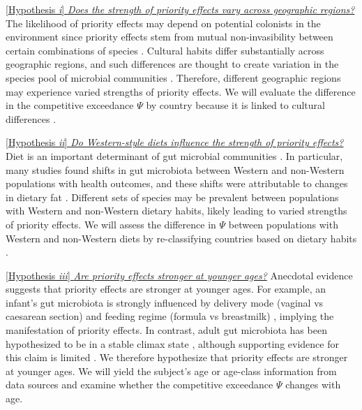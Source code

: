 \documentclass[12pt, class=article, crop=false]{standalone}
\begin{document}
\ul{[Hypothesis \textit{i}] \textit{Does the strength of priority effects vary across geographic regions?}} 
The likelihood of priority effects may depend on potential colonists in the environment since priority effects stem from mutual non-invasibility between certain combinations of species \citep{fukami_historical_2015}.
Cultural habits differ substantially across geographic regions, and such differences are thought to create variation in the species pool of microbial communities \citep{de_filippo_impact_2010, yatsunenko_human_2012, david_host_2014}.
Therefore, different geographic regions may experience varied strengths of priority effects.
We will evaluate the difference in the competitive exceedance $\Psi$ by country because it is linked to cultural differences \citep{yatsunenko_human_2012}.

\ul{[Hypothesis \textit{ii}] \textit{Do Western-style diets influence the strength of priority effects?}}
Diet is an important determinant of gut microbial communities \citep{de_filippo_impact_2010, yatsunenko_human_2012, schnorr_gut_2014, zimmer_vegan_2012, smits_seasonal_2017}.
In particular, many studies found shifts in gut microbiota between Western and non-Western populations with health outcomes, and these shifts were attributable to changes in dietary fat \citep{reese_thinking_2019}.
Different sets of species may be prevalent between populations with Western and non-Western dietary habits, likely leading to varied strengths of priority effects. 
We will assess the difference in $\Psi$ between populations with Western and non-Western diets by re-classifying countries based on dietary habits \citep{kariel_proposed_1966}.

\ul{[Hypothesis \textit{iii}] \textit{Are priority effects stronger at younger ages?}}
Anecdotal evidence suggests that priority effects are stronger at younger ages.
For example, an infant's gut microbiota is strongly influenced by delivery mode (vaginal vs caesarean section) and feeding regime (formula vs breastmilk) \citep{bokulich_antibiotics_2016, akagawa_effect_2019, dominguez-bello_delivery_2010}, implying the manifestation of priority effects.
In contrast, adult gut microbiota has been hypothesized to be in a stable climax state \citep{fierer_animalcules_2012, costello_application_2012}, although supporting evidence for this claim is limited \citep{fierer_animalcules_2012}.
We therefore hypothesize that priority effects are stronger at younger ages.
We will yield the subject's age or age-class information from data sources and examine whether the competitive exceedance $\Psi$ changes with age.
\end{document}
